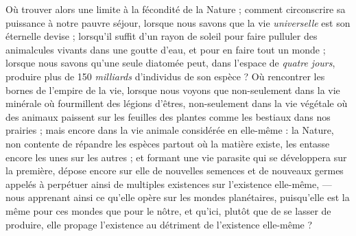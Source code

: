 \documentclass[a4paper, 11pt, oneside, landscape]{article}
\begin{document}
Où trouver alors une limite à la fécondité de la Nature ; comment circonscrire sa puissance à notre pauvre séjour, lorsque nous savons que la vie \emph{universelle} est son éternelle devise ; lorsqu'il suffit d'un rayon de soleil pour faire pulluler des animalcules vivants dans une goutte d'eau, et pour en faire tout un monde ; lorsque nous savons qu'une seule diatomée peut, dans l'espace de \emph{quatre jours}, produire plus de 150 \emph{milliards} d'individus de son espèce ? Où rencontrer les bornes de l'empire de la vie, lorsque nous voyons que non-seulement dans la vie minérale où fourmillent des légions d'êtres, non-seulement dans la vie végétale où des animaux paissent sur les feuilles des plantes comme les bestiaux dans nos prairies ; mais encore dans la vie animale considérée en elle-même : la Nature, non contente de répandre les espèces partout où la matière existe, les entasse encore les unes sur les autres ; et formant une vie parasite qui se développera sur la première, dépose encore sur elle de nouvelles semences et de nouveaux germes appelés à perpétuer ainsi de multiples existences sur l'existence elle-même, --- nous apprenant ainsi ce qu'elle opère sur les mondes planétaires, puisqu'elle est la même pour ces mondes que pour le nôtre, et qu'ici, plutôt que de se lasser de produire, elle propage l'existence au détriment de l'existence elle-même ?
\end{document}
